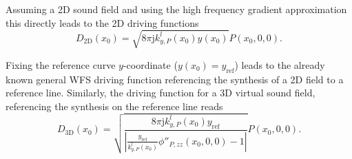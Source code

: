 \documentclass[12pt,a4paper]{article}
\newcommand{\ti}{\mathrm{j}}
\newcommand{\yref}{y_{\mathrm{ref}}}
\begin{document}
Assuming a 2D sound field and using the high frequency gradient approximation this directly leads to the 2D driving functions
\begin{equation}
D_{2\mathrm{D}}(x_0) = 
\sqrt{ 8\pi \ti k^l_{y,P}(x_0) y(x_0) }
 P(x_0,0,0).
\end{equation}

Fixing the reference curve $y$-coordinate ($y(x_0) = \yref$) leads to the already known general WFS driving function referencing the synthesis of a 2D field to a reference line. Similarly, the driving function for a 3D virtual sound field, referencing the synthesis on the reference line reads
\begin{equation}
D_{3\mathrm{D}}(x_0) = 
\sqrt{ \frac{8\pi \ti k^l_{y,P}(x_0) \yref }{\left| \frac{\yref}{k^l_{y,P}(x_0)}\phi''_{P,zz}(x_0,0,0	) - 1 \right|}} P(x_0,0,0).
\end{equation}
\end{document}
